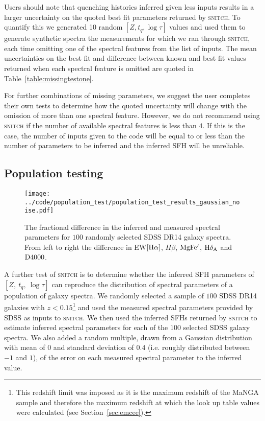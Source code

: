 \documentclass[useAMS,usenatbib]{mn2e}
\begin{document}
Users should note that quenching histories inferred given less inputs results in a larger uncertainty on the quoted best fit parameters returned by \textsc{snitch}. To quantify this we generated 10 random $[Z, t_q, \log \tau]$ values and used them to generate synthetic spectra the measurements for which we ran through \textsc{snitch}, each time omitting one of the spectral features from the list of inputs. The mean uncertainties on the best fit and difference between known and best fit values returned when each spectral feature is omitted are quoted in Table~\ref{table:missingtestone}. 

For further combinations of missing parameters, we suggest the user completes their own tests to determine how the quoted uncertainty will change with the omission of more than one spectral feature. However, we do not recommend using \textsc{snitch} if the number of available spectral features is less than $4$. If this is the case, the number of inputs given to the code will be equal to or less than the number of parameters to be inferred and the inferred SFH will be unreliable. 

\subsection{Population testing}\label{sec:poptest}

\begin{figure*}
\centering
\texttt{[image: ../code/population\_test/population\_test\_results\_gaussian\_noise.pdf]}
\caption{The fractional difference in the inferred and measured spectral parameters for $100$ randomly selected SDSS DR14 galaxy spectra. From left to right the difference in EW$[\rm{H}\alpha]$, $H\beta$, $\rm{MgFe'}$, $\rm{H}\delta_A$ and $\rm{D4000}$.}
\label{fig:sdsscompare}
\end{figure*}


A further test of \textsc{snitch} is to determine whether the inferred SFH parameters of $[Z,~t_q,~\log\tau]$ can reproduce the distribution of spectral parameters of a population of galaxy spectra. We randomly selected a sample of $100$ SDSS DR14 galaxies with $z < 0.15$\footnote{This redshift limit was imposed as it is the maximum redshift of the MaNGA sample and therefore the maximum redshift at which the look up table values were calculated (see Section~\ref{sec:emcee}).} and used the measured spectral parameters provided by SDSS as inputs to \textsc{snitch}. We then used the inferred SFHs returned by \textsc{snitch} to estimate inferred spectral parameters for each of the $100$ selected SDSS galaxy spectra. We also added a random multiple, drawn from a Gaussian distribution with mean of $0$ and standard deviation of $0.4$ (i.e. roughly distributed between $-1$ and $1$), of the error on each measured spectral parameter to the inferred value.
\end{document}
